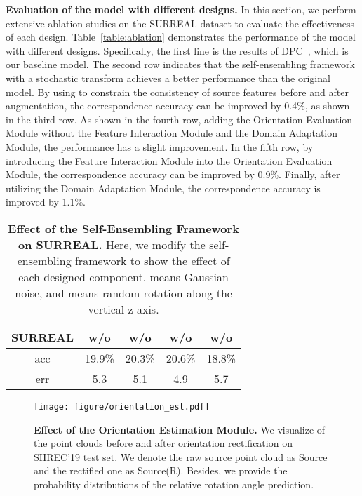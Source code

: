 \textbf{Evaluation of the model  with different designs.}
In this section, we perform extensive ablation studies on the SURREAL dataset to evaluate the effectiveness of each design.
Table~\ref{table:ablation} demonstrates the performance of the model with different designs.
Specifically, the first line is the results of DPC~\cite{lang2021dpc}, which is our baseline model. 
The second row indicates that the self-ensembling framework with a stochastic transform achieves a better performance than the original model.
By using  to constrain the consistency of source features before and after augmentation, the correspondence accuracy can be improved by 0.4\%, as shown in the third row.
As shown in the fourth row, adding the Orientation Evaluation Module without the Feature Interaction Module and the Domain Adaptation Module, the performance has a slight improvement.
In the fifth row, by introducing the Feature Interaction Module into the Orientation Evaluation Module, the correspondence accuracy can be improved by 0.9\%.
Finally, after utilizing the Domain Adaptation Module, the correspondence accuracy is improved by 1.1\%.
\begin{table}[!t]
\begin{center}
      \footnotesize
      \setlength\tabcolsep{6pt}
      \caption{\textbf{Effect of the Self-Ensembling Framework on SURREAL.} Here, we modify the self-ensembling framework to show the effect of each designed component.  means Gaussian noise, and  means random rotation along the vertical z-axis.}
      \label{table:Self-Ensemble}
      \vspace{-0.8em}
      \begin{tabular}{c|c|c|c|c}
          \toprule
          SURREAL &w/o & w/o & w/o &w/o \\
          \midrule
          acc  & 19.9\% & 20.3\% & 20.6\% &18.8\% \\
          err  & 5.3 & 5.1 & 4.9 &5.7 \\
          \bottomrule
      \end{tabular}
      \vspace{-2em}
  \end{center}
\end{table}

\begin{figure}[!t]
  \vspace{-0.5em}
  \begin{center}
      \texttt{[image: figure/orientation\_est.pdf]}
      \vspace{-1.4em}
      \caption{\textbf{Effect of the Orientation Estimation Module.} We visualize of the point clouds before and after orientation rectification on SHREC'19 test set. We denote the raw source point cloud as Source and the rectified one as Source(R). Besides, we provide the probability distributions of the relative rotation angle prediction.}
      \vspace{-2.0em}
      \label{orientation_est}
  \end{center}
\end{figure}


